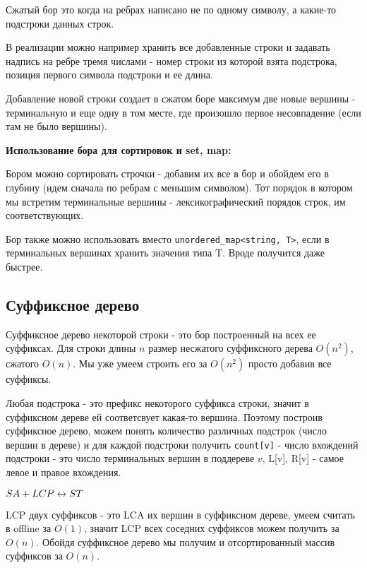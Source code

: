 \begin{Def}
Сжатый бор это когда на ребрах написано не по одному символу, а какие-то подстроки данных строк.  
\end{Def}

В реализации можно например хранить все добавленные строки и задавать надпись на ребре тремя числами - номер строки из которой взята подстрока, позиция первого символа подстроки и ее длина.

Добавление новой строки создает в сжатом боре максимум две новые вершины - терминальную и еще одну в том месте, где произошло первое несовпадение (если там не было вершины).

\textbf{Использование бора для сортировок и set, map:}

Бором можно сортировать строчки - добавим их все в бор и обойдем его в глубину (идем сначала по ребрам с меньшим символом). Тот порядок в котором мы встретим терминальные вершины - лексикографический порядок строк, им соответствующих.

Бор также можно использовать вместо \texttt{unordered\_map<string, T>}, если в терминальных вершинах хранить значения типа T. Вроде получится даже быстрее.

\subsection{Суффиксное дерево}
\begin{Def}
Суффиксное дерево некоторой строки - это бор построенный на всех ее суффиксах. Для строки длины $n$ размер несжатого суффиксного дерева $O(n^2)$, сжатого $O(n)$. Мы уже умеем строить его за $O(n^2)$ просто добавив все суффиксы.
\end{Def}

Любая подстрока - это префикс некоторого суффикса строки, значит в суффиксном дереве ей соответсвует какая-то вершина. Поэтому построив суффиксное дерево, можем понять количество различных подстрок (число вершин в дереве) и для каждой подстроки получить
\texttt{count[v]} - число вхождений подстроки - это число терминальных вершин в поддереве $v$, L[v], R[v] - самое левое и правое вхождения.

\textbf{$SA + LCP \leftrightarrow ST$}

LCP двух суффиксов - это LCA их вершин в суффиксном дереве, умеем считать в offline  за $O(1)$, значит LCP всех соседних суффиксов можем получить за $O(n)$. Обойдя суффиксное дерево мы получим и отсортированный массив суффиксов за $O(n)$.

